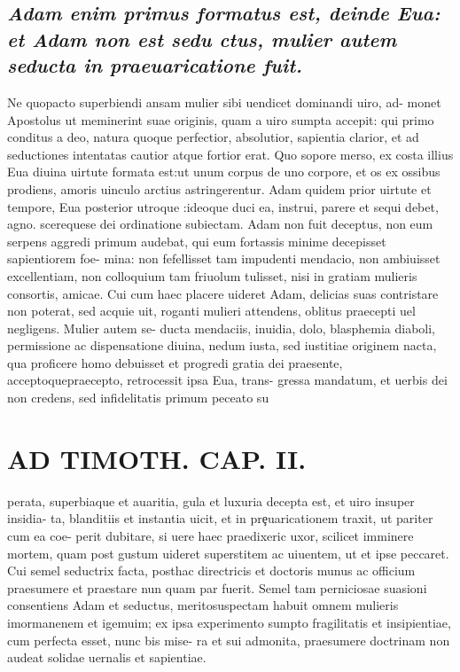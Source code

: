 \documentclass{article}
\begin{document}
\begin{pages}
\subsection*{\textit{Adam enim primus formatus est, deinde Eua: et Adam non est sedu ctus, mulier autem seducta in praeuaricatione fuit. }}\pstart Ne quopacto superbiendi ansam mulier sibi uendicet dominandi uiro, ad- monet Apostolus ut meminerint suae originis, quam a uiro sumpta accepit: qui primo conditus a deo, natura quoque  perfectior, absolutior, sapientia clarior, et ad seductiones intentatas cautior atque  fortior erat. Quo sopore merso, ex costa illius Eua diuina uirtute formata est:ut unum corpus de uno corpore, et os ex ossibus prodiens, amoris uinculo arctius astringerentur. Adam quidem prior uirtute et tempore, Eua posterior utroque :ideoque  duci ea, instrui, parere et sequi debet, agno. scerequese dei ordinatione subiectam. Adam non fuit deceptus, non eum serpens aggredi primum audebat, qui eum fortassis minime decepisset sapientiorem foe- mina: non fefellisset tam impudenti mendacio, non ambiuisset excellentiam, non colloquium tam friuolum tulisset, nisi in gratiam mulieris consortis, amicae. Cui cum haec placere uideret Adam, delicias suas contristare non poterat, sed acquie uit, roganti mulieri attendens, oblitus praecepti uel negligens. Mulier autem se- ducta mendaciis, inuidia, dolo, blasphemia diaboli, permissione ac dispensatione diuina, nedum iusta, sed iustitiae originem nacta, qua proficere homo debuisset et progredi gratia dei praesente, acceptoquepraecepto, retrocessit ipsa Eua, trans- gressa mandatum, et uerbis dei non credens, sed infidelitatis primum peceato su  \pend
\section*{AD TIMOTH. CAP. II. }
\marginpar{[ p.489 ]}\pstart perata, superbiaque  et auaritia, gula et luxuria decepta est, et uiro insuper insidia- ta, blanditiis et instantia uicit, et in prȩuaricationem traxit, ut pariter cum ea coe- perit dubitare, si uere haec praedixeric uxor, scilicet imminere mortem, quam post gustum uideret superstitem ac uiuentem, ut et ipse peccaret. Cui semel seductrix facta, posthac directricis et doctoris munus ac officium praesumere et praestare nun quam par fuerit. Semel tam perniciosae suasioni consentiens Adam et seductus, meritosuspectam habuit omnem mulieris imormanenem et igemuim; ex ipsa experimento sumpto fragilitatis et insipientiae, cum perfecta esset, nunc bis mise- ra et sui admonita, praesumere doctrinam non audeat solidae uernalis et sapientiae.  \pend
{}
{}

\end{pages}
\end{document}
